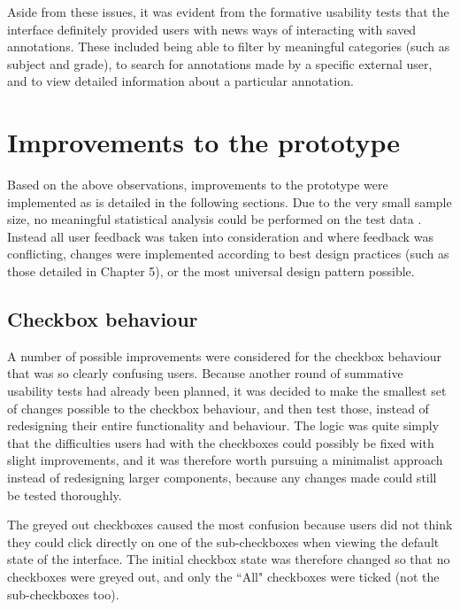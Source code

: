 Aside from these issues, it was evident from the formative usability tests that the interface definitely provided users with news ways of interacting with saved annotations. These included being able to filter by meaningful categories (such as subject and grade), to search for annotations made by a specific external user, and to view detailed information about a particular annotation. 



\section{Improvements to the prototype}
Based on the above observations, improvements to the prototype were implemented as is detailed in the following sections. Due to the very small sample size, no meaningful statistical analysis could be performed on the test data \citep[p. 149]{Hartson}. Instead all user feedback was taken into consideration and where feedback was conflicting, changes were implemented according to best design practices (such as those detailed in Chapter 5), or the most universal design pattern possible.
\subsection{Checkbox behaviour}
A number of possible improvements were considered for the checkbox behaviour that was so clearly confusing users. Because another round of summative usability tests had already been planned, it was decided to make the smallest set of changes possible to the checkbox behaviour, and then test those, instead of redesigning their entire functionality and behaviour. The logic was quite simply that the difficulties users had with the checkboxes could possibly be fixed with slight improvements, and it was therefore worth pursuing a minimalist approach instead of redesigning larger components,  because any changes made could still be tested thoroughly.

The greyed out checkboxes caused the most confusion because users did not think they could click directly on one of the sub-checkboxes when viewing the default state of the interface. The initial checkbox state was therefore changed so that no checkboxes were greyed out, and only the ``All" checkboxes were ticked (not the sub-checkboxes too).  

